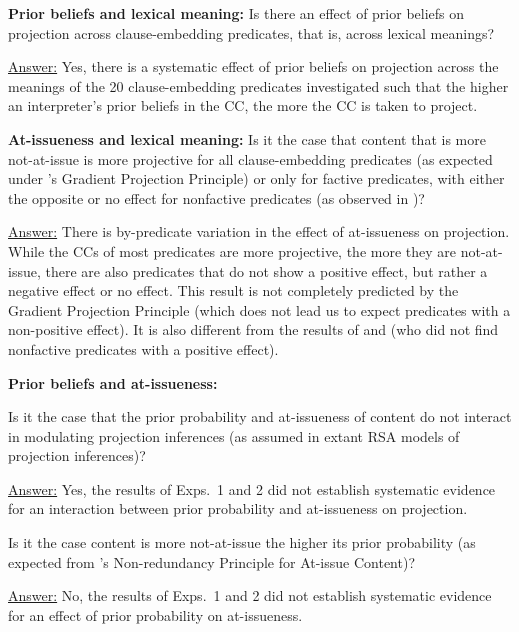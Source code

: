 \documentclass[11pt,fleqn]{article}
\newcommand{\6}{\mbox{$[\hspace*{-.6mm}[$}}
\newcommand{\9}{\mbox{$]\hspace*{-.6mm}]$}}
\newcommand{\citepos}[1]{\citeauthor{#1}'s \citeyear{#1}}
\begin{document}
\begin{exe}

 {\bf Prior beliefs and lexical meaning:} Is there an effect of prior beliefs on projection across clause-embedding predicates, that is, across lexical meanings? 

\underline{Answer:} Yes, there is a systematic effect of prior beliefs on projection across the meanings of the 20 clause-embedding predicates investigated such that the higher an interpreter's prior beliefs in the CC, the more the CC is taken to project.

 {\bf At-issueness and lexical meaning:} Is it the case that content that is more not-at-issue is more projective for all clause-embedding predicates (as expected under \citepos{tbd-variability} Gradient Projection Principle) or only for factive predicates, with either the opposite or no effect for nonfactive predicates (as observed in \citealt{djaerv-bacovcin-salt27,djaerv-bacovcin2020,mahler-etal2020})? 

\underline{Answer:} There is by-predicate variation in the effect of at-issueness on projection. While the CCs of most predicates are more projective, the more they are not-at-issue, there are also predicates that do not show a positive effect, but rather a negative effect or no effect. This result is  not completely predicted by the Gradient Projection Principle (which does not lead us to expect predicates with a non-positive effect). It is also different from the results of \citealt{djaerv-bacovcin2020} and \citealt{mahler-etal2020} (who did not find nonfactive predicates with a positive effect).

 {\bf Prior beliefs and at-issueness:} 
\begin{xlist}
 Is it the case that the prior probability and at-issueness of content do not interact in modulating projection inferences  (as assumed in extant RSA models of projection inferences)? 

\underline{Answer:} Yes, the results of Exps.~1 and 2 did not establish systematic evidence for an interaction between prior probability and at-issueness on projection.

 Is it the case content is more not-at-issue the higher its prior probability (as expected from \citepos{tonhauser-etal-eval} Non-redundancy Principle for At-issue Content)? 

\underline{Answer:} No, the results of Exps.~1 and 2 did not establish systematic evidence for an effect of prior probability on at-issueness. 

\end{xlist}
\end{exe}
\end{document}
